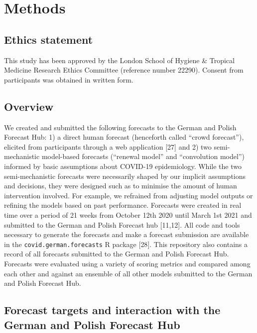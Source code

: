 \documentclass[10pt,letterpaper]{article}
\begin{document}
\hypertarget{methods}{%
\section{Methods}\label{methods}}

\hypertarget{ethics-statement}{%
\subsection{Ethics statement}\label{ethics-statement}}

This study has been approved by the London School of Hygiene \& Tropical
Medicine Research Ethics Committee (reference number 22290). Consent
from participants was obtained in written form.

\hypertarget{overview}{%
\subsection{Overview}\label{overview}}

We created and submitted the following forecasts to the German and
Polish Forecast Hub: 1) a direct human forecast (henceforth called
``crowd forecast''), elicited from participants through a web
application {[}27{]} and 2) two semi-mechanistic model-based forecasts
(``renewal model'' and ``convolution model'') informed by basic
assumptions about COVID-19 epidemiology. While the two semi-mechanistic
forecasts were necessarily shaped by our implicit assumptions and
decisions, they were designed such as to minimise the amount of human
intervention involved. For example, we refrained from adjusting model
outputs or refining the models based on past performance. Forecasts were
created in real time over a period of 21 weeks from October 12th 2020
until March 1st 2021 and submitted to the German and Polish Forecast hub
{[}11,12{]}. All code and tools necessary to generate the forecasts and
make a forecast submission are available in the
\texttt{covid.german.forecasts} R package {[}28{]}. This repository also
contains a record of all forecasts submitted to the German and Polish
Forecast Hub. Forecasts were evaluated using a variety of scoring
metrics and compared among each other and against an ensemble of all
other models submitted to the German and Polish Forecast Hub.

\hypertarget{forecast-targets-and-interaction-with-the-german-and-polish-forecast-hub}{%
\subsection{Forecast targets and interaction with the German and Polish
Forecast
Hub}\label{forecast-targets-and-interaction-with-the-german-and-polish-forecast-hub}}
\end{document}
